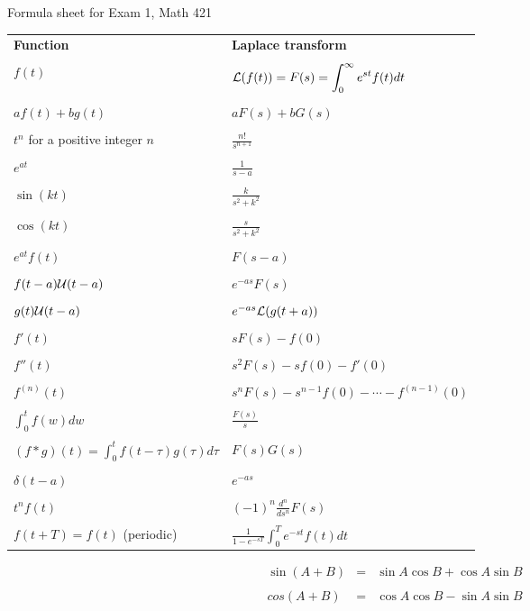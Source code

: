 \documentclass[10pt]{article}
\begin{document}
\begin{center}
	 {\Large \sc Formula sheet for Exam 1, Math 421
\par} 	\end{center}



\begin{center}
\begin{tabular}{p{2.5in} p{2.5in}}
{\bf Function}&{\bf Laplace transform}\\
\\
$f(t)$&${\displaystyle 
{\cal L}(f(t))=F(s)=\int_{0}^{\infty}e^{st}f(t)dt}$\\ \\
$af(t)+bg(t)$&$aF(s)+bG(s)$\\ \\
$t^{n}$ for a positive integer $n$&${\displaystyle 
\frac{n!}{s^{n+1}}}$\\ \\
$e^{at}$&${\displaystyle \frac{1}{s-a}}$\\ \\
$\sin (kt)$&${\displaystyle \frac{k}{s^{2}+k^{2}}}$\\\\ 
$\cos (kt)$&${\displaystyle \frac{s}{s^{2}+k^{2}}}$\\\\ 
$e^{at}f(t)$&$F(s-a)$\\ \\
$f(t-a){\cal U}(t-a)$&$e^{-as}F(s)$\\ \\
$g(t){\cal U}(t-a)$&$e^{-as}{\cal L}(g(t+a))$\\ \\
$f'(t)$&$sF(s)-f(0)$\\\\
$f''(t)$&$s^{2}F(s)-sf(0)-f'(0)$\\\\
$f^{(n)}(t)$&$s^{n}F(s)-s^{n-1}f(0)-\cdots -f^{(n-1)}(0)$\\\\
${\displaystyle \int_{0}^{t}f(w)dw}$&${\displaystyle \frac{F(s)}{s}}$\\\\ 
${\displaystyle (f*g)(t)=\int_{0}^{t}f(t-\tau)g(\tau)d\tau}$&
$F(s)G(s)$\\\\ 
$\delta(t-a)$&$e^{-as}$\\ \\
$t^{n}f(t)$&${\displaystyle (-1)^{n}\frac{d^{n}}{ds^{n}}F(s)}$\\ \\
$f(t+T)=f(t)$ (periodic)&${\displaystyle \frac{1}{1-e^{-sT}}\int_{0}^{T}
e^{-st}f(t)dt}$\\ 
\end{tabular}
\end{center}

\begin{eqnarray*}
\sin(A+B)&=&\sin A\cos B+\cos A\sin B\\
\\cos(A+B)&=&\cos A\cos B-\sin A\sin B
\end{eqnarray*}
\end{document}
